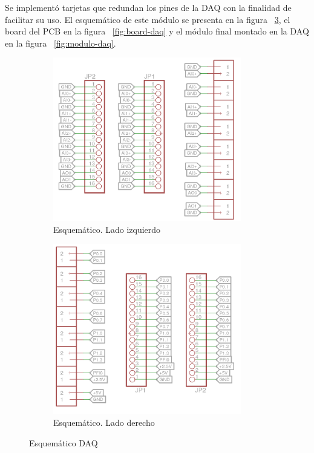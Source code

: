 Se implementó tarjetas que redundan los pines de la DAQ con la finalidad de facilitar su uso. El esquemático de este módulo se presenta en la figura ~\ref{fig:schematic-daq}, el board del PCB en la figura ~\ref{fig:board-daq} y el módulo final montado en la DAQ en la figura ~\ref{fig:modulo-daq}. 

\begin{figure}[h!]
  \centering
  \begin{subfigure}{0.4\textwidth}
    \centering
    \includegraphics[width=0.9\textwidth]{images/activities/daq/schematic-daq-left.png}
    \caption{Esquemático. Lado izquierdo}
    \label{fig:schematic-daq-left}
  \end{subfigure}
  \begin{subfigure}{0.4\textwidth}
    \centering
    \includegraphics[width=0.9\textwidth]{images/activities/daq/schematic-daq-right.png}
    \caption{Esquemático. Lado derecho}
    \label{fig:schematic-daq-right}
  \end{subfigure}
  \caption{Esquemático DAQ}
  \label{fig:schematic-daq}
\end{figure}

